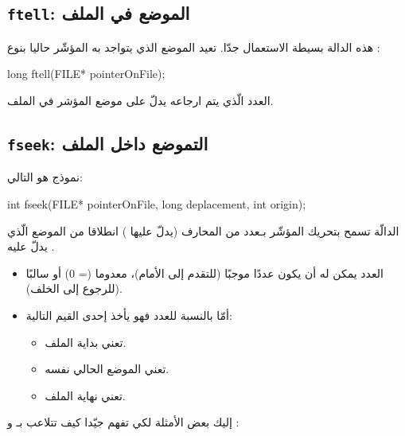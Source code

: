 \subsection{\texttt{ftell}: الموضع في الملف}

هذه الدالة بسيطة الاستعمال جدّا. تعيد الموضع الذي يتواجد به المؤشّر حاليا بنوع
:

\begin{Csource}
long ftell(FILE* pointerOnFile);
\end{Csource}

العدد الّذي يتم ارجاعه يدلّ على موضع المؤشر في الملف.

\subsection{\texttt{fseek}: التموضع داخل الملف}

نموذج
هو التالي:

\begin{Csource}
int fseek(FILE* pointerOnFile, long deplacement, int origin);
\end{Csource}

الدالّة
تسمح بتحريك المؤشّر بـعدد من المحارف (يدلّ عليها
)
انطلاقا من الموضع الّذي يدلّ عليه
.

\begin{itemize}
  \item العدد
يمكن له أن يكون عددًا موجبًا (للتقدم إلى الأمام)، معدوما (= 0) أو سالبًا (للرجوع إلى الخلف).
  \item أمّا بالنسبة للعدد
فهو يأخذ إحدى القيم التالية:
  \begin{itemize}
    \item {}
تعني بداية الملف.
    \item {}
تعني الموضع الحالي نفسه.
    \item {}
تعني نهاية الملف.
  \end{itemize}
\end{itemize}

إليك بعض الأمثلة لكي تفهم جيّدا كيف تتلاعب بـ
و
:

